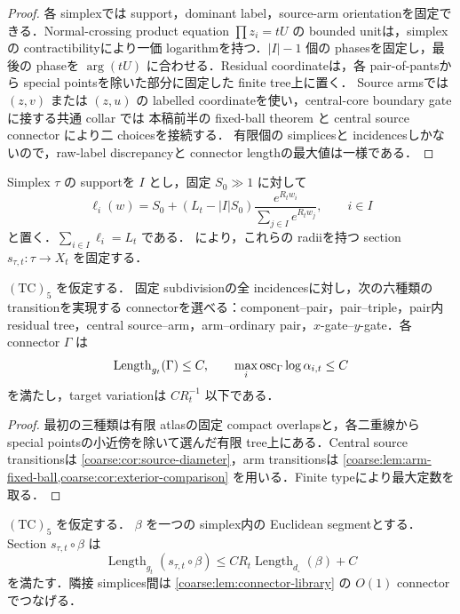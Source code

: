\documentclass[a4paper,11pt]{ltjsarticle}
\numberwithin{equation}{section}
\theoremstyle{plain}
\theoremstyle{definition}
\theoremstyle{remark}
\newcommand{\Length}{\operatorname{Length}}\newcommand{\Lip}{\operatorname{Lip}}\newcommand{\GH}{\mathrm{GH}}\newcommand{\id}{\mathrm{id}}
\begin{document}
\begin{proof}
各 simplexでは support，dominant label，source-arm orientationを固定できる．Normal-crossing product equation
$\prod z_i=tU$ の bounded unitは，simplexの contractibilityにより一価 logarithmを持つ．$|I|-1$ 個の phasesを固定し，最後の phaseを
$\arg(tU)$ に合わせる．Residual coordinateは，各 pair-of-pantsから special pointsを除いた部分に固定した finite tree上に置く．
Source armsでは $(z,v)$ または $(z,u)$ の labelled coordinateを使い，central-core boundary gate に接する共通 collar では 本稿前半の fixed-ball theorem と central source connector により二 choicesを接続する．
有限個の simplicesと incidencesしかないので，raw-label discrepancyと connector lengthの最大値は一様である．
\end{proof}

Simplex $\tau$ の supportを $I$ とし，固定 $S_0\gg1$ に対して
\begin{equation}\label{coarse:eq:soft-depths}
 \ell_i(w)=S_0+(L_t-|I|S_0)
 \frac{e^{R_tw_i}}{\sum_{j\in I}e^{R_tw_j}},
 \qquad i\in I
\end{equation}
と置く．$\sum_{i\in I}\ell_i=L_t$ である． により，これらの radiiを持つ
section $s_{\tau,t}:\tau\to X_t$ を固定する．

\begin{lemma}\label{coarse:lem:connector-library}
$\mathrm{(TC)}_5$ を仮定する．
固定 subdivisionの全 incidencesに対し，次の六種類の transitionを実現する connectorを選べる：component--pair，pair--triple，pair内 residual tree，central source--arm，arm--ordinary pair，$x$-gate--$y$-gate．各 connector $\Gamma$ は
\[
 \Length_{g_t}(\Gamma)\le C,
 \qquad
 \max_i\osc_\Gamma\log\alpha_{i,t}\le C
\]
を満たし，target variationは $CR_t^{-1}$ 以下である．
\end{lemma}

\begin{proof}
最初の三種類は有限 atlasの固定 compact overlapsと，各二重線から special pointsの小近傍を除いて選んだ有限 tree上にある．Central source transitionsは \cref{coarse:cor:source-diameter}，arm transitionsは \cref{coarse:lem:arm-fixed-ball,coarse:cor:exterior-comparison} を用いる．Finite typeにより最大定数を取る．
\end{proof}

\begin{proposition}\label{coarse:prop:section-lifting}
$\mathrm{(TC)}_5$ を仮定する．
$\beta$ を一つの simplex内の Euclidean segmentとする．Section $s_{\tau,t}\circ\beta$ は
\[
 \Length_{g_t}(s_{\tau,t}\circ\beta)
 \le CR_t\Length_{d_\square}(\beta)+C
\]
を満たす．隣接 simplices間は \cref{coarse:lem:connector-library} の $O(1)$ connectorでつなげる．
\end{proposition}
\end{document}

